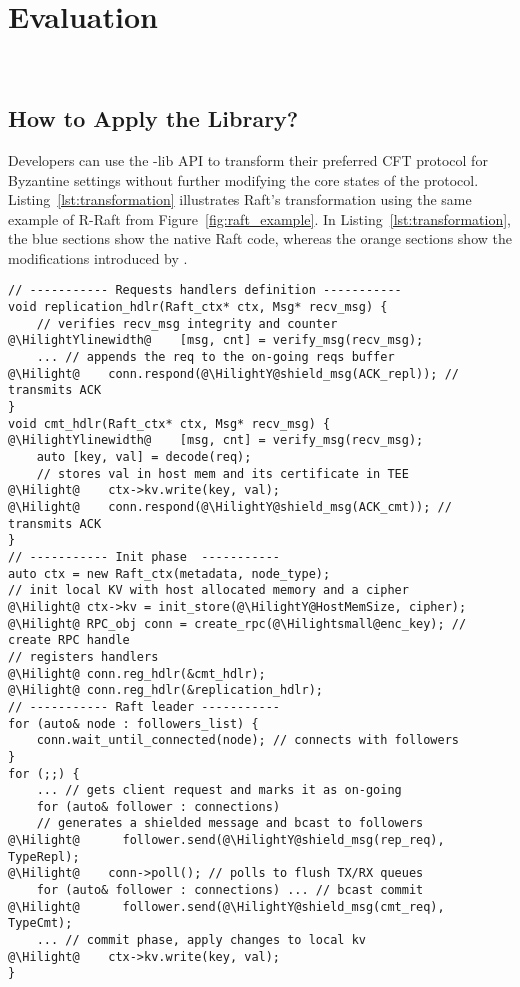 \section{Evaluation}~\label{sec:eval}
\vspace{-15pt}
\subsection{How to Apply the \projecttitle{} Library?} Developers can use the \projecttitle{}-lib API to transform their preferred CFT protocol for Byzantine settings without further modifying the core states of the protocol. Listing~\ref{lst:transformation} illustrates Raft's transformation using the same example of R-Raft from Figure~\ref{fig:raft_example}.  In Listing~\ref{lst:transformation}, the blue sections show the native Raft code, whereas the orange sections show the modifications introduced by \projecttitle{}.
\vspace{10pt}



\begin{lstlisting}[frame=h,style=customc,
                    label={lst:transformation},
                    caption= Raft transformation using \projecttitle{}: blue sections (native Raft) and orange sections (\projecttitle additions).]
// ----------- Requests handlers definition -----------
void replication_hdlr(Raft_ctx* ctx, Msg* recv_msg) {
    // verifies recv_msg integrity and counter
@\HilightYlinewidth@    [msg, cnt] = verify_msg(recv_msg);
    ... // appends the req to the on-going reqs buffer
@\Hilight@    conn.respond(@\HilightY@shield_msg(ACK_repl)); // transmits ACK
}
void cmt_hdlr(Raft_ctx* ctx, Msg* recv_msg) {
@\HilightYlinewidth@    [msg, cnt] = verify_msg(recv_msg);
    auto [key, val] = decode(req);
    // stores val in host mem and its certificate in TEE
@\Hilight@    ctx->kv.write(key, val);  
@\Hilight@    conn.respond(@\HilightY@shield_msg(ACK_cmt)); // transmits ACK
}
// ----------- Init phase  -----------
auto ctx = new Raft_ctx(metadata, node_type); 
// init local KV with host allocated memory and a cipher
@\Hilight@ ctx->kv = init_store(@\HilightY@HostMemSize, cipher); 
@\Hilight@ RPC_obj conn = create_rpc(@\Hilightsmall@enc_key); // create RPC handle
// registers handlers
@\Hilight@ conn.reg_hdlr(&cmt_hdlr);
@\Hilight@ conn.reg_hdlr(&replication_hdlr);
// ----------- Raft leader -----------
for (auto& node : followers_list) {
    conn.wait_until_connected(node); // connects with followers
}
for (;;) {
    ... // gets client request and marks it as on-going
    for (auto& follower : connections) 
    // generates a shielded message and bcast to followers
@\Hilight@      follower.send(@\HilightY@shield_msg(rep_req), TypeRepl);    
@\Hilight@    conn->poll(); // polls to flush TX/RX queues 
    for (auto& follower : connections) ... // bcast commit
@\Hilight@      follower.send(@\HilightY@shield_msg(cmt_req), TypeCmt);
    ... // commit phase, apply changes to local kv
@\Hilight@    ctx->kv.write(key, val); 
}
\end{lstlisting}

